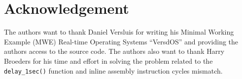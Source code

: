 \section{Acknowledgement}

The authors want to thank Daniel Versluis for writing his Minimal Working Example (MWE) Real-time Operating Systems \enquote{VersdOS} and providing the authors access to the source code.
The authors also want to thank Harry Broeders for his time and effort in solving the problem related to the \texttt{delay\_1sec()} function and inline assembly instruction cycles mismatch.
